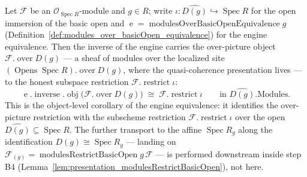 \begin{lemma}
  \label{lem:restrict_over_compat}
  Let \(\mathcal{F}\) be an \(\mathcal{O}_{\operatorname{Spec} R}\)-module and \(g \in R\); write
  \(\iota : \widehat{D(g)} \hookrightarrow \operatorname{Spec} R\) for the open immersion of the basic
  open and \(\operatorname{e} = \operatorname{modulesOverBasicOpenEquivalence} g\)
  (Definition~\ref{def:modules_over_basicOpen_equivalence}) for the engine equivalence. Then the
  inverse of the engine carries the over-picture object \(\mathcal{F}.\operatorname{over} D(g)\) — a
  sheaf of modules over the localized site \((\operatorname{Opens} \operatorname{Spec}
  R).\operatorname{over} D(g)\), where the quasi-coherence presentation lives — to the honest subspace
  restriction \(\mathcal{F}.\operatorname{restrict} \iota\):
  \[
    \operatorname{e}.\operatorname{inverse}.\operatorname{obj}
      \bigl(\mathcal{F}.\operatorname{over} D(g)\bigr)
      \;\cong\; \mathcal{F}.\operatorname{restrict} \iota
    \qquad \text{in } \widehat{D(g)}.\mathrm{Modules}.
  \]
  This is the object-level corollary of the engine equivalence: it identifies the over-picture
  restriction with the subscheme restriction \(\mathcal{F}.\operatorname{restrict} \iota\) over the open
  \(\widehat{D(g)} \subseteq \operatorname{Spec} R\). The further transport to the affine
  \(\operatorname{Spec} R_g\) along the identification \(D(g) \cong \operatorname{Spec} R_g\) — landing on
  \(\mathcal{F}_{(g)} = \operatorname{modulesRestrictBasicOpen} g\, \mathcal{F}\)
  — is performed downstream inside
  step B4 (Lemma~\ref{lem:presentation_modulesRestrictBasicOpen}), not here.
\end{lemma}
